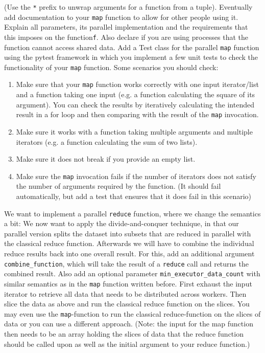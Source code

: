 \documentclass[]{erlangen-problemset}
\begin{document}
\begin{problem}[title={Parallel operators}]
(Use the \texttt{*} prefix to unwrap arguments for a function from a tuple).
Eventually add documentation to your \texttt{map} function to allow for other people using it.
Explain all parameters, its parallel implementation and the requirements that this imposes on the function\texttt{f}.
Also declare if you are using processes that the function cannot access shared data.
\Question Add a Test class for the parallel \texttt{map} function using the pytest framework in which you implement a few unit tests to check the functionality of your \texttt{map} function. 
Some scenarios you should check:
\begin{enumerate}
    \item Make sure that your \texttt{map} function works correctly with one input iterator/list and a function taking one input (e.g. a function calculating the square of its argument). You can check the results by iteratively calculating the intended result in a for loop and then comparing with the result of the \texttt{map} invocation.
    \item Make sure it works with a function taking multiple arguments and multiple iterators (e.g. a function calculating the sum of two lists).
    \item Make sure it does not break if you provide an empty list.
    \item Make sure the \texttt{map} invocation fails if the number of iterators does not satisfy the number of arguments required by the function. (It should fail automatically, but add a test that ensures that it does fail in this scenario)
\end{enumerate}
\Question We want to implement a parallel \texttt{reduce} function, where we change the semantics a bit:
We now want to apply the divide-and-conquer technique, in that our parallel version splits the dataset into subsets that are reduced in parallel with the classical reduce function.
Afterwards we will have to combine the individual reduce results back into one overall result.
For this, add an additional argument \texttt{combine\_function}, which will take the result of a \texttt{reduce} call and returns the combined result.
Also add an optional parameter \texttt{min\_executor\_data\_count} with similar semantics as in the \texttt{map} function written before.
First exhaust the input iterator to retrieve all data that needs to be distributed across workers.
Then slice the data as above and run the classical reduce function on the slices.
You may even use the \texttt{map}-function to run the classical reduce-function on the slices of data or you can use a different approach. (Note: the input for the map function then needs to be an array holding the slices of data that the reduce function should be called upon as well as the initial argument to your reduce function.)

\end{problem}
\end{document}
